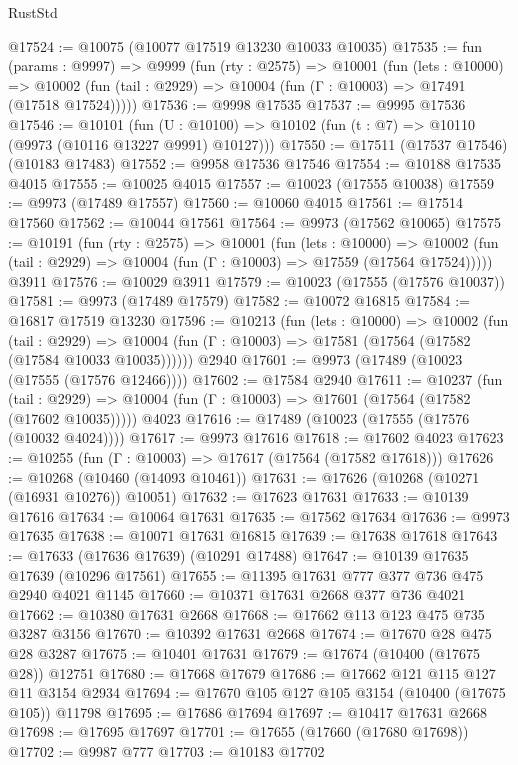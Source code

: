 \begin{lexlean}{RustStd}
\begin{coremodule}
@17524 := @10075 (@10077 @17519 @13230 @10033 @10035)
@17535 := fun (params : @9997) =>
  @9999
    (fun (rty : @2575) =>
    @10001
      (fun (lets : @10000) =>
      @10002 (fun (tail : @2929) => @10004 (fun (Γ : @10003) => @17491 (@17518 @17524)))))
@17536 := @9998 @17535
@17537 := @9995 @17536
@17546 := @10101
    (fun (U : @10100) => @10102 (fun (t : @7) => @10110 (@9973 (@10116 @13227 @9991) @10127)))
@17550 := @17511 (@17537 @17546) (@10183 @17483)
@17552 := @9958 @17536 @17546
@17554 := @10188 @17535 @4015
@17555 := @10025 @4015
@17557 := @10023 (@17555 @10038)
@17559 := @9973 (@17489 @17557)
@17560 := @10060 @4015
@17561 := @17514 @17560
@17562 := @10044 @17561
@17564 := @9973 (@17562 @10065)
@17575 := @10191
    (fun (rty : @2575) =>
    @10001
      (fun (lets : @10000) =>
      @10002 (fun (tail : @2929) => @10004 (fun (Γ : @10003) => @17559 (@17564 @17524)))))
    @3911
@17576 := @10029 @3911
@17579 := @10023 (@17555 (@17576 @10037))
@17581 := @9973 (@17489 @17579)
@17582 := @10072 @16815
@17584 := @16817 @17519 @13230
@17596 := @10213
    (fun (lets : @10000) =>
    @10002
      (fun (tail : @2929) =>
      @10004 (fun (Γ : @10003) => @17581 (@17564 (@17582 (@17584 @10033 @10035))))))
    @2940
@17601 := @9973 (@17489 (@10023 (@17555 (@17576 @12466))))
@17602 := @17584 @2940
@17611 := @10237
    (fun (tail : @2929) => @10004 (fun (Γ : @10003) => @17601 (@17564 (@17582 (@17602 @10035)))))
    @4023
@17616 := @17489 (@10023 (@17555 (@17576 (@10032 @4024))))
@17617 := @9973 @17616
@17618 := @17602 @4023
@17623 := @10255 (fun (Γ : @10003) => @17617 (@17564 (@17582 @17618)))
@17626 := @10268 (@10460 (@14093 @10461))
@17631 := @17626 (@10268 (@10271 (@16931 @10276)) @10051)
@17632 := @17623 @17631
@17633 := @10139 @17616
@17634 := @10064 @17631
@17635 := @17562 @17634
@17636 := @9973 @17635
@17638 := @10071 @17631 @16815
@17639 := @17638 @17618
@17643 := @17633 (@17636 @17639) (@10291 @17488)
@17647 := @10139 @17635 @17639 (@10296 @17561)
@17655 := @11395 @17631 @777 @377 @736 @475 @2940 @4021 @1145
@17660 := @10371 @17631 @2668 @377 @736 @4021
@17662 := @10380 @17631 @2668
@17668 := @17662 @113 @123 @475 @735 @3287 @3156
@17670 := @10392 @17631 @2668
@17674 := @17670 @28 @475 @28 @3287
@17675 := @10401 @17631
@17679 := @17674 (@10400 (@17675 @28)) @12751
@17680 := @17668 @17679
@17686 := @17662 @121 @115 @127 @11 @3154 @2934
@17694 := @17670 @105 @127 @105 @3154 (@10400 (@17675 @105)) @11798
@17695 := @17686 @17694
@17697 := @10417 @17631 @2668
@17698 := @17695 @17697
@17701 := @17655 (@17660 (@17680 @17698))
@17702 := @9987 @777
@17703 := @10183 @17702

\end{coremodule}
\end{lexlean}

